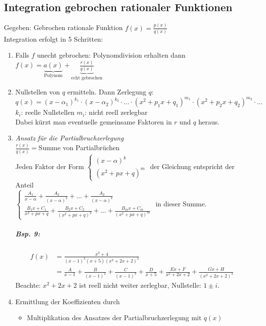 \subsection{Integration gebrochen rationaler Funktionen}
Gegeben: Gebrochen rationale Funktion $f(x)=\frac{p(x)}{q(x)}$\\
Integration erfolgt in 5 Schritten:
\begin{enumerate}
\item Falls $f$ unecht gebrochen: Polynomdivision erhalten dann $f(x) =\underbrace{a(x)}_{\text{Polynom}} + \underbrace{\frac{r(x)}{q(x)}}_{\text{echt gebrochen}}$
\item Nullstellen von $q$ ermitteln. Dann Zerlegung $q$: \\
$q(x) = (x-\alpha_1)^{k_1}\cdot (x-\alpha_2)^{k_2}\cdot \dots \cdot (x^2+p_1x+q_1)^{m_1}\cdot (x^2+p_2x+q_2)^{m_2}\cdot \dots$\\
$k_i$: reelle Nullstellen \qquad $m_i$: nicht reell zerlegbar\\
Dabei kürzt man eventuelle gemeinsame Faktoren in $r$ und $q$ heraus.
\item \emph{Ansatz für die Partialbruchzerlegung}\\
$\frac{r(x)}{q(x)}= $Summe von Partialbrüchen\\
Jeden Faktor der Form $\begin{cases}
(x-\alpha)^k\\
(x^2+px+q)^m
\end{cases}$ der Gleichung entspricht der Anteil \\
$\begin{cases}
\frac{A_1}{x-\alpha}+\frac{A_2}{(x-\alpha)^2}+\dots + \frac{A_2}{(x-\alpha)^k}\\
\frac{B_1x+C_1}{x^2+px+q}+\frac{B_2 x + C_2}{(x^2+px+q)^2}+\dots + \frac{B_m x + C_m}{(x^2+px+q)^m}
\end{cases}$ in dieser Summe.
\subparagraph{Bsp. 9:}
\begin{align*}
f(x) &= \frac{x^2+4}{(x-1)^3(x+5)(x^2+2x+2)^2}\\
&=\frac{A}{x-1}+\frac{B}{(x-1)^2}+\frac{C}{(x-1)^3}+ \frac{D}{x+5}+ \frac{Ex+F}{x^2+2x+2}+\frac{Gx+H}{(x^2+2x+2)^2}
\end{align*}
Beachte: $x^2+2x+2$ ist reell nicht weiter zerlegbar, Nullstelle: $1\pm i$.
\item Ermittlung der Koeffizienten durch 
\begin{itemize}
\item Multiplikation des Ansatzes der Partialbruchzerlegung mit $q(x)$

\end{itemize}
\end{enumerate}
